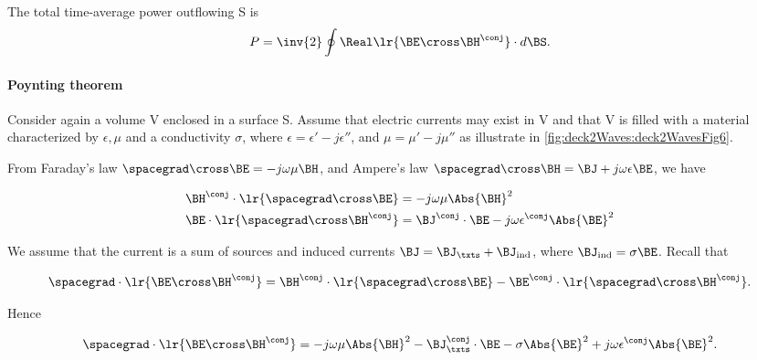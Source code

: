 The total time-average power outflowing S is
\begin{equation}\label{eqn:uwavesLecture2:1200}
P = \inv{2} \oint \Real\lr{ \BE \cross \BH^\conj } \cdot d\BS.
\end{equation}

\paragraph{Poynting theorem}

Consider again a volume V enclosed in a surface S.  Assume that electric currents may exist in V and that V is filled with a material characterized by \( \epsilon, \mu \) and a conductivity \( \sigma \), where \( \epsilon = \epsilon' -j \epsilon'' \), and \( \mu = \mu' - j \mu'' \) as illustrate in \cref{fig:deck2Waves:deck2WavesFig6}.


From Faraday's law \( \spacegrad \cross \BE = - j \omega \mu \BH \), and Ampere's law
\( \spacegrad \cross \BH = \BJ + j \omega \epsilon \BE \), we have

\begin{equation}\label{eqn:uwavesLecture2:1220}
\begin{aligned}
\BH^\conj \cdot \lr{ \spacegrad \cross \BE } &= - j \omega \mu \Abs{\BH}^2 \\
\BE \cdot \lr{ \spacegrad \cross \BH^\conj } &= \BJ^\conj \cdot \BE - j \omega \epsilon^\conj \Abs{\BE}^2
\end{aligned}
\end{equation}

We assume that the current is a sum of sources and induced currents \( \BJ = \BJ_\txts + \BJ_{\mathrm{ind}} \), where \( \BJ_{\mathrm{ind}} = \sigma \BE \).  Recall that

\begin{equation}\label{eqn:uwavesLecture2:1240}
\spacegrad \cdot \lr{ \BE \cross \BH^\conj } =
\BH^\conj \cdot \lr{ \spacegrad \cross \BE }
-\BE^\conj \cdot \lr{ \spacegrad \cross \BH^\conj }.
\end{equation}

Hence

\begin{equation}\label{eqn:uwavesLecture2:1260}
\spacegrad \cdot \lr{ \BE \cross \BH^\conj }
=
- j \omega \mu \Abs{\BH}^2 - \BJ_\txts^\conj \cdot \BE - \sigma \Abs{\BE}^2 + j \omega \epsilon^\conj \Abs{\BE}^2.
\end{equation}

